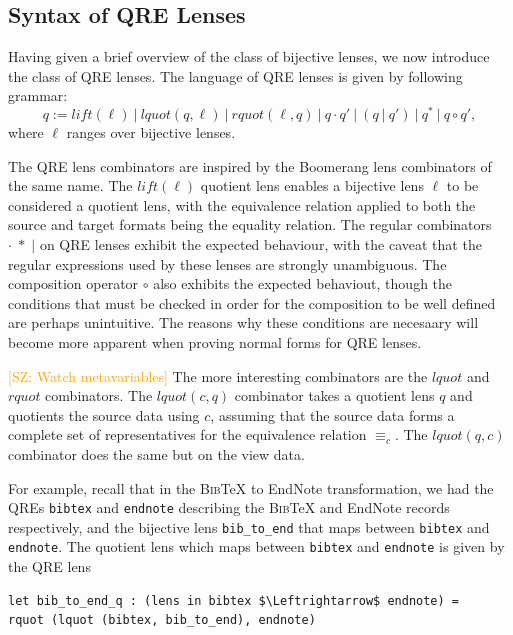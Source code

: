 \documentclass{svproc}
\newcommand{\cd}[1]{\lstinline[backgroundcolor=\color{white}]$#1$}
\newcommand{\FINISH}[3]{\ifdraft\textcolor{#1}{[#2: #3]}\fi}
\newcommand{\saz}[1]{\FINISH{orange}{SZ}{#1}}
\newcommand{\sep}{\ensuremath{\ | \ }}
\newcommand{\bibtex}{\textsc{Bib}\TeX{}}
\newcommand{\eqrel}[1]{\ensuremath{\equiv_{#1}}}
\begin{document}
\subsection{Syntax of QRE Lenses}
Having given a brief overview of the class of bijective lenses, we now introduce
the class of QRE lenses. The language of QRE lenses is given by following
grammar:
$$ q := \mathit{lift}(\ell) \sep \mathit{lquot}(q, \ell) \sep
\mathit{rquot}(\ell, q) \sep q \cdot q' \sep (q \sep q') \sep q^* \sep q \circ q',$$
where $\ell$ ranges over bijective lenses.

The QRE lens combinators are inspired by the Boomerang lens combinators of the
same name. The $\mathit{lift}(\ell)$ quotient lens enables a bijective lens
$\ell$ to be considered a quotient lens, with the equivalence relation applied
to both the source and target formats being the equality relation. The
regular combinators $\cdot \; * \; |$ on QRE lenses exhibit the expected
behaviour, with the caveat that the regular expressions used by these lenses
are strongly unambiguous. The composition operator $\circ$ also exhibits the
expected behaviout, though the conditions that must be checked in order for the
composition to be well defined are perhaps unintuitive. The reasons why
these conditions are necesaary will become more apparent when proving normal
forms for QRE lenses.

\saz{Watch metavariables}
The more interesting combinators are the $\mathit{lquot}$ and $\mathit{rquot}$
combinators. The $\mathit{lquot}(c, q)$ combinator takes a quotient lens $q$ and
quotients the source data using $c$, assuming that the source data forms a
complete set of representatives for the equivalence relation $\eqrel{c}$. The
$\mathit{lquot}(q, c)$ combinator does the same but on the view data. 

For example, recall that in the \bibtex{} to EndNote transformation, we had the
QREs \cd{bibtex} and \cd{endnote} describing the \bibtex{} and EndNote records
respectively, and the bijective lens \cd{bib_to_end} that maps between
\cd{bibtex} and \cd{endnote}. The quotient lens which maps between
\cd{bibtex} and \cd{endnote} is given by the QRE lens

\begin{lstlisting}
let bib_to_end_q : (lens in bibtex $\Leftrightarrow$ endnote) = 
rquot (lquot (bibtex, bib_to_end), endnote)
 \end{lstlisting} 
\end{document}
